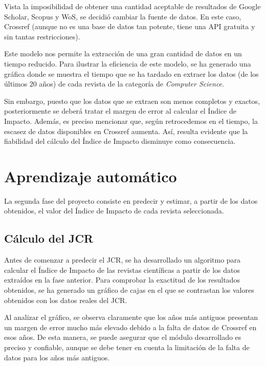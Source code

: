 Vista la imposibilidad de obtener una cantidad aceptable de resultados de Google Scholar, Scopus y WoS, se decidió cambiar la fuente de datos. En este caso, Crossref (aunque no es una base de datos tan potente, tiene una API gratuita y sin tantas restricciones).

Este modelo nos permite la extracción de una gran cantidad de datos en un tiempo reducido. Para ilustrar la eficiencia de este modelo, se ha generado una gráfica donde se muestra el tiempo que se ha tardado en extraer los datos (de los últimos 20 años) de cada revista de la categoría de \textit{Computer Science}.


Sin embargo, puesto que los datos que se extraen son menos completos y exactos, posteriormente se deberá tratar el margen de error al calcular el Índice de Impacto. Además, es preciso mencionar que, según retrocedemos en el tiempo, la escasez de datos disponibles en Crossref aumenta. Así, resulta evidente que la fiabilidad del cálculo del Índice de Impacto disminuye como consecuencia.

\section{Aprendizaje automático}
La segunda fase del proyecto consiste en predecir y estimar, a partir de los datos obtenidos, el valor del Índice de Impacto de cada revista seleccionada.

\subsection{Cálculo del JCR}
Antes de comenzar a predecir el JCR, se ha desarrollado un algoritmo para calcular el Índice de Impacto de las revistas científicas a partir de los datos extraídos en la fase anterior. Para comprobar la exactitud de los resultados obtenidos, se ha generado un gráfico de cajas en el que se contrastan los valores obtenidos con los datos reales del JCR. 

%


Al analizar el gráfico, se observa claramente que los años más antiguos presentan un margen de error mucho más elevado debido a la falta de datos de Crossref en esos años. De esta manera, se puede asegurar que el módulo desarrollado es preciso y confiable, aunque se debe tener en cuenta la limitación de la falta de datos para los años más antiguos.

